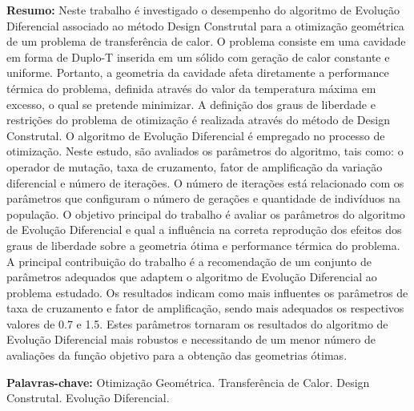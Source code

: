 \documentclass[12pt,A4,A4pt]{article}
\begin{document}
\begin{flushleft}
{\small {} \justify
\textbf{Resumo:} Neste trabalho é investigado o desempenho do algoritmo de Evolução Diferencial  associado ao método Design Construtal para a otimização geométrica de um problema de transferência de calor. O problema consiste em uma cavidade em forma de Duplo-T inserida em um sólido com geração de calor constante e uniforme. Portanto, a geometria da cavidade afeta diretamente a performance térmica do problema, definida através do valor da temperatura máxima em excesso, o qual se pretende minimizar. A definição dos graus de liberdade e restrições do problema de otimização é realizada através do método de Design Construtal. O algoritmo de Evolução Diferencial é empregado no processo de otimização. Neste estudo, são avaliados os parâmetros do algoritmo, tais como: o operador de mutação, taxa de cruzamento, fator de amplificação da variação diferencial e número de iterações. O número de iterações está relacionado com os parâmetros que configuram o número de gerações e quantidade de indivíduos na população.  O objetivo principal do trabalho é avaliar os parâmetros do algoritmo de Evolução Diferencial e qual a influência na correta reprodução dos efeitos dos graus de liberdade sobre a geometria ótima e performance térmica do problema. A principal contribuição do trabalho é a recomendação de um conjunto de parâmetros adequados que adaptem o algoritmo de Evolução Diferencial ao problema estudado. Os resultados indicam como mais influentes os parâmetros de taxa de cruzamento e fator de amplificação, sendo mais adequados os  respectivos valores de 0.7 e 1.5. Estes parâmetros tornaram os resultados do algoritmo de Evolução Diferencial mais robustos e necessitando de um menor número de avaliações da função objetivo para a obtenção das geometrias ótimas.

\vspace{0.3cm}

\noindent\textbf{Palavras-chave:} Otimização Geométrica. Transferência de Calor. Design Construtal. Evolução Diferencial.}
\end{flushleft}


\end{document}
